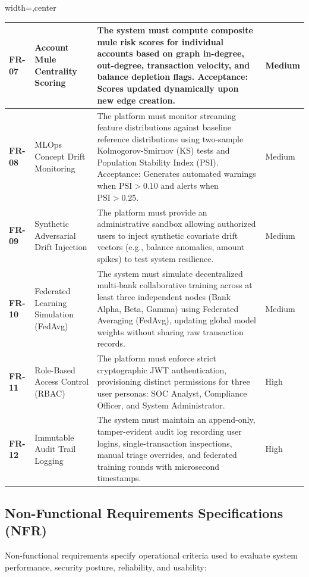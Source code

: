 \documentclass[12pt,a4paper,oneside]{report}
\begin{document}
\begin{table}[H]
\begin{adjustbox}{width=\textwidth,center}
\begin{tabular}{| l | l | l | l |}
\textbf{FR-07} & Account Mule Centrality Scoring & The system must compute composite mule risk scores for individual accounts based on graph in-degree, out-degree, transaction velocity, and balance depletion flags. Acceptance: Scores updated dynamically upon new edge creation. & Medium \\ \hline
\rowcolor{tablealt} \textbf{FR-08} & MLOps Concept Drift Monitoring & The platform must monitor streaming feature distributions against baseline reference distributions using two-sample Kolmogorov-Smirnov (KS) tests and Population Stability Index (PSI). Acceptance: Generates automated warnings when $\text{PSI} > 0.10$ and alerts when $\text{PSI} > 0.25$. & Medium \\ \hline
\textbf{FR-09} & Synthetic Adversarial Drift Injection & The platform must provide an administrative sandbox allowing authorized users to inject synthetic covariate drift vectors (e.g., balance anomalies, amount spikes) to test system resilience. & Medium \\ \hline
\rowcolor{tablealt} \textbf{FR-10} & Federated Learning Simulation (FedAvg) & The system must simulate decentralized multi-bank collaborative training across at least three independent nodes (Bank Alpha, Beta, Gamma) using Federated Averaging (FedAvg), updating global model weights without sharing raw transaction records. & Medium \\ \hline
\textbf{FR-11} & Role-Based Access Control (RBAC) & The platform must enforce strict cryptographic JWT authentication, provisioning distinct permissions for three user personas: SOC Analyst, Compliance Officer, and System Administrator. & High \\ \hline
\rowcolor{tablealt} \textbf{FR-12} & Immutable Audit Trail Logging & The system must maintain an append-only, tamper-evident audit log recording user logins, single-transaction inspections, manual triage overrides, and federated training rounds with microsecond timestamps. & High \\ \hline
\end{tabular}
\end{adjustbox}
\end{table}


\subsection{Non-Functional Requirements Specifications (NFR)}

Non-functional requirements specify operational criteria used to evaluate system performance, security posture, reliability, and usability:
\end{document}
